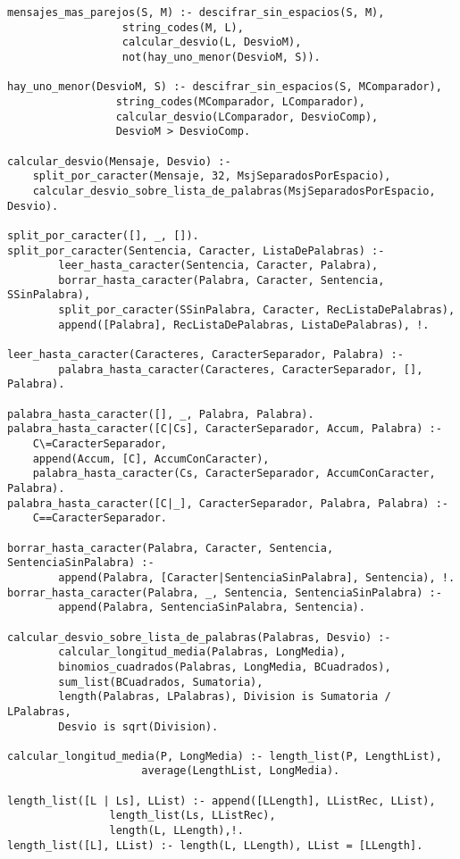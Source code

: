 \documentclass[spanish, 10pt,a4paper]{article}
\numberwithin{equation}{section} %
\begin{document}
\begin{lstlisting}
mensajes_mas_parejos(S, M) :- descifrar_sin_espacios(S, M), 
			      string_codes(M, L),
  			      calcular_desvio(L, DesvioM), 
			      not(hay_uno_menor(DesvioM, S)).

hay_uno_menor(DesvioM, S) :- descifrar_sin_espacios(S, MComparador),
			     string_codes(MComparador, LComparador),
			     calcular_desvio(LComparador, DesvioComp),
			     DesvioM > DesvioComp.

calcular_desvio(Mensaje, Desvio) :- 
	split_por_caracter(Mensaje, 32, MsjSeparadosPorEspacio), 
	calcular_desvio_sobre_lista_de_palabras(MsjSeparadosPorEspacio, Desvio).

split_por_caracter([], _, []).
split_por_caracter(Sentencia, Caracter, ListaDePalabras) :- 
		leer_hasta_caracter(Sentencia, Caracter, Palabra),
		borrar_hasta_caracter(Palabra, Caracter, Sentencia, SSinPalabra),
		split_por_caracter(SSinPalabra, Caracter, RecListaDePalabras),
		append([Palabra], RecListaDePalabras, ListaDePalabras), !.

leer_hasta_caracter(Caracteres, CaracterSeparador, Palabra) :- 
		palabra_hasta_caracter(Caracteres, CaracterSeparador, [], Palabra).

palabra_hasta_caracter([], _, Palabra, Palabra).
palabra_hasta_caracter([C|Cs], CaracterSeparador, Accum, Palabra) :- 
	C\=CaracterSeparador,
	append(Accum, [C], AccumConCaracter),
	palabra_hasta_caracter(Cs, CaracterSeparador, AccumConCaracter, Palabra).
palabra_hasta_caracter([C|_], CaracterSeparador, Palabra, Palabra) :- 
	C==CaracterSeparador.

borrar_hasta_caracter(Palabra, Caracter, Sentencia, SentenciaSinPalabra) :- 
		append(Palabra, [Caracter|SentenciaSinPalabra], Sentencia), !.
borrar_hasta_caracter(Palabra, _, Sentencia, SentenciaSinPalabra) :- 
		append(Palabra, SentenciaSinPalabra, Sentencia).

calcular_desvio_sobre_lista_de_palabras(Palabras, Desvio) :- 
		calcular_longitud_media(Palabras, LongMedia), 
		binomios_cuadrados(Palabras, LongMedia, BCuadrados), 
		sum_list(BCuadrados, Sumatoria), 
		length(Palabras, LPalabras), Division is Sumatoria / LPalabras, 
		Desvio is sqrt(Division).

calcular_longitud_media(P, LongMedia) :- length_list(P, LengthList), 
					 average(LengthList, LongMedia).

length_list([L | Ls], LList) :- append([LLength], LListRec, LList), 
				length_list(Ls, LListRec),
				length(L, LLength),!. 
length_list([L], LList) :- length(L, LLength), LList = [LLength].


\end{lstlisting}
\end{document}
